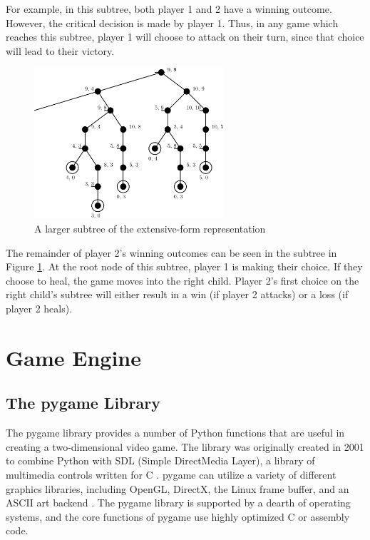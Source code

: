 For example, in this subtree, both player 1 and 2 have a winning outcome. However, the critical decision is made by player 1. Thus, in any game which reaches this subtree, player 1 will choose to attack on their turn, since that choice will lead to their victory.\\

\begin{figure}[H]
  \centering
  \includegraphics[width=7cm]{figures/GameSubtree2.png}
  \caption{A larger subtree of the extensive-form representation}
  \label{fig:gameSubtree2}
\end{figure}

The remainder of player 2's winning outcomes can be seen in the subtree in Figure \ref{fig:gameSubtree2}. At the root node of this subtree, player 1 is making their choice. If they choose to heal, the game moves into the right child. Player 2's first choice on the right child's subtree will either result in a win (if player 2 attacks) or a loss (if player 2 heals).

\section{Game Engine}
\subsection{The pygame Library}
The pygame library provides a number of Python functions that are useful in creating a two-dimensional video game. The library was originally created in 2001 to combine Python with SDL (Simple DirectMedia Layer), a library of multimedia controls written for C \cite{shinners}. pygame can utilize a variety of different graphics libraries, including OpenGL, DirectX, the Linux frame buffer, and an ASCII art backend \cite{shinners}. The pygame library is supported by a dearth of operating systems, and the core functions of pygame use highly optimized C or assembly code.\\

